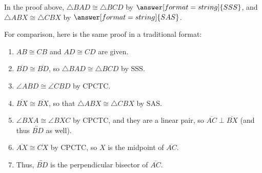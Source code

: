 \documentclass[nooutcomes]{ximera}
\begin{document}
\begin{problem}
\begin{image}
\end{image}

In the proof above, $\triangle BAD \cong \triangle BCD$ by $\answer[format=string]{SSS}$, and 
$\triangle ABX \cong \triangle CBX$ by $\answer[format=string]{SAS}$.  

\begin{feedback}[correct]
For comparison, here is the same proof in a traditional format:
\begin{enumerate}
\item $AB\cong CB$ and $AD\cong CD$ are given.  
\item $\overline{BD}\cong \overline{BD}$, so $\triangle BAD \cong \triangle BCD$ by SSS.  
\item $\angle ABD \cong \angle CBD$ by CPCTC. 
\item $\overline{BX}\cong \overline{BX}$, so that $\triangle ABX \cong \triangle CBX$ by SAS.  
\item $\angle BXA \cong \angle BXC$ by CPCTC, and they are a linear pair, 
so $\overline{AC}\perp\overline{BX}$ (and thus $\overleftrightarrow{BD}$ as well). 
\item $\overline{AX}\cong \overline{CX}$ by CPCTC, so $X$ is the midpoint of $\overline{AC}$.
\item Thus, $\overleftrightarrow{BD}$ is the perpendicular bisector of $\overline{AC}$.
\end{enumerate}
\end{feedback}
\end{problem}
\end{document}

